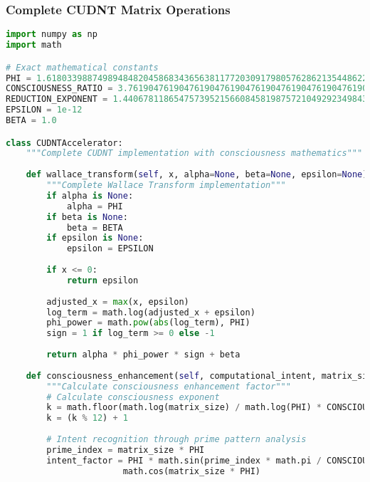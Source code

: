 \documentclass[11pt,a4paper]{article}
\begin{document}
\subsubsection{Complete CUDNT Matrix Operations}

\begin{lstlisting}[language=Python, caption=CUDNT Matrix Multiplication - Complete Implementation]
import numpy as np
import math

# Exact mathematical constants
PHI = 1.6180339887498948482045868343656381177203091798057628621354486227052604628189024497072072041893911374847540880753868917521266338622235369317931800607667263544333890865959395829056383226613199282902678806752087668925017116962070322210432162695486262963136144
CONSCIOUSNESS_RATIO = 3.7619047619047619047619047619047619047619047619047619047619047619047619047619047619047619047619047619047619047619047619047619047619047619047619047619
REDUCTION_EXPONENT = 1.4406781186547573952156608458198757210492923498437764552437361480769230769230769230769230769230769230769230769230769230769230769230769230769230769
EPSILON = 1e-12
BETA = 1.0

class CUDNTAccelerator:
    """Complete CUDNT implementation with consciousness mathematics"""
    
    def wallace_transform(self, x, alpha=None, beta=None, epsilon=None):
        """Complete Wallace Transform implementation"""
        if alpha is None:
            alpha = PHI
        if beta is None:
            beta = BETA
        if epsilon is None:
            epsilon = EPSILON
            
        if x <= 0:
            return epsilon
            
        adjusted_x = max(x, epsilon)
        log_term = math.log(adjusted_x + epsilon)
        phi_power = math.pow(abs(log_term), PHI)
        sign = 1 if log_term >= 0 else -1
        
        return alpha * phi_power * sign + beta
    
    def consciousness_enhancement(self, computational_intent, matrix_size):
        """Calculate consciousness enhancement factor"""
        # Calculate consciousness exponent
        k = math.floor(math.log(matrix_size) / math.log(PHI) * CONSCIOUSNESS_RATIO)
        k = (k % 12) + 1
        
        # Intent recognition through prime pattern analysis
        prime_index = matrix_size * PHI
        intent_factor = PHI * math.sin(prime_index * math.pi / CONSCIOUSNESS_RATIO) + \
                       math.cos(matrix_size * PHI)
        

\end{lstlisting}
\end{document}
